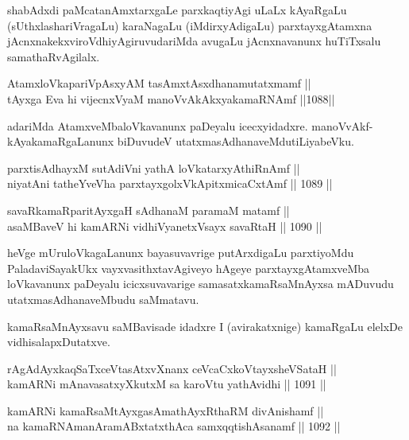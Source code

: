 \begin{artha}
shabAdxdi paMcatanAmxtarxgaLe parxkaqtiyAgi uLaLx kAyaRgaLu (sUthxlashariVragaLu) karaNagaLu (iMdirxyAdigaLu) parxtayxgAtamxna jAcnxnakekx\break viroVdhiyAgiruvudariMda avugaLu jAcnxnavanunx huTiTxsalu samathaRvAgilalx.
\end{artha}

\begin{shl}
AtamxloVkapariVpAsxyAM tasAmxtAsxdhanamutatxmamf || \\
tAyxga Eva hi vijecnxVyaM manoVvAkAkxyakamaRNAmf \hfill ||1088||  
\end{shl}

\begin{artha}
adariMda AtamxveMbaloVkavanunx paDeyalu icecxyidadxre. manoVvAkf-kAyakamaRgaLanunx biDuvudeV utatxmasAdhanaveMdu\break tiLiyabeVku.
\end{artha}

\begin{shl}
parxtisAdhayxM sutAdiVni yathA loVkatarxyAthiRnAmf || \\
niyatAni tatheYveVha parxtayxgolxVkApitxmicaCxtAmf \hfill || 1089 ||  
\end{shl}
				
\begin{shl}
savaRkamaRparitAyxgaH sAdhanaM paramaM matamf || \\
asaMBaveV hi kamARNi vidhiVyanetxV\s sayx savaRtaH \hfill || 1090 ||  
\end{shl}

\begin{artha}
heVge mUruloVkagaLanunx bayasuvavrige putArxdigaLu parxtiyoMdu PaladaviSayakUkx vayxvasithxtavAgiveyo hAgeye parxtayxgAtamxveMba loVkavanunx paDeyalu icicxsuvavarige samasatxkamaRsaMnAyxsa mADuvudu utatxmasAdhanaveMbudu saMmatavu.
\end{artha}

\begin{artha}
kamaRsaMnAyxsavu saMBavisade idadxre I (avirakatxnige) kamaRgaLu elelxDe vidhisalapxDutatxve.
\end{artha}

\begin{shl}
rAgAdAyxkaqSaTxceVtasAtxvXnanx ceVcaCxkoVtayxsheVSataH || \\
kamARNi mAnavasatxyXkutxM sa karoVtu yathAvidhi \hfill || 1091 ||  
\end{shl}
				
\begin{shl}
kamARNi kamaRsaMtAyxgasAmathAyxRthaRM divAnishamf ||  \\
na kamaRNAmanAramABxtatxthAca samxqqtishAsanamf \hfill || 1092 ||
\end{shl}

